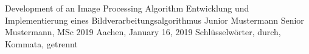 \documentclass[12pt,a4paper,titlepage,twoside,numbers=noenddot,BCOR10mm]{scrreprt}
\begin{document}
%
%
\addtolength{\topmargin}{1cm}
\pagestyle{empty}
%
             {Development of an Image Processing Algorithm}      %
             {Entwicklung und Implementierung eines Bildverarbeitungsalgorithmus}     %
             {Junior Mustermann}                     %
             {Senior Mustermann, MSc}         		 %
             {2019}                                  %
             {Aachen, January 16, 2019}         %
             {Schlüsselwörter, durch, Kommata, getrennt} %

\addtolength{\topmargin}{-1cm}

\cleardoublepage

%
%
\pagestyle{plain}
\tableofcontents
\cleardoublepage
%
%
\pagestyle{empty}
\listoffigures
{}
\cleardoublepage


\pagestyle{fancy} %

\renewcommand{\chaptermark}[1]{\markboth{\thechapter\ #1}{}}
\renewcommand{\sectionmark}[1]{\markright{\thesection\ #1}{}}
\end{document}
